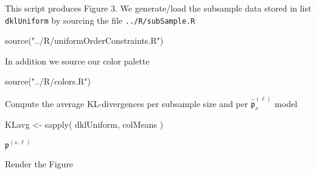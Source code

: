 \documentclass[
]{article}
\newenvironment{Shaded}{\begin{snugshade}}{\end{snugshade}}
\newcommand{\FunctionTok}[1]{\textcolor[rgb]{0.00,0.00,0.00}{#1}}
\newcommand{\NormalTok}[1]{#1}
\newcommand{\OtherTok}[1]{\textcolor[rgb]{0.56,0.35,0.01}{#1}}
\newcommand{\StringTok}[1]{\textcolor[rgb]{0.31,0.60,0.02}{#1}}
\newcommand{\prob}[1]{\mathfrak{#1}}
\newcommand{\maxentP}{\hat{\prob p}}
\begin{document}
This script produces Figure 3. We generate/load the subsample data
stored in list \texttt{dklUniform} by sourcing the file
\texttt{../R/subSample.R}

\begin{Shaded}
\begin{Highlighting}[]
\FunctionTok{source}\NormalTok{(}\StringTok{"../R/uniformOrderConstraints.R"}\NormalTok{)}
\end{Highlighting}
\end{Shaded}

In addition we source our color palette

\begin{Shaded}
\begin{Highlighting}[]
\FunctionTok{source}\NormalTok{(}\StringTok{"../R/colors.R"}\NormalTok{)}
\end{Highlighting}
\end{Shaded}

Compute the average KL-divergences per subsample size and per
\(\maxentP_{s}^{(\ell)}\) model

\begin{Shaded}
\begin{Highlighting}[]
\NormalTok{KLavg }\OtherTok{\textless{}{-}} \FunctionTok{sapply}\NormalTok{(}
\NormalTok{  dklUniform, }
\NormalTok{  colMeans  }
\NormalTok{)}
\end{Highlighting}
\end{Shaded}

\(\prob p^{(s,\ell)}\)

Render the Figure
\end{document}
